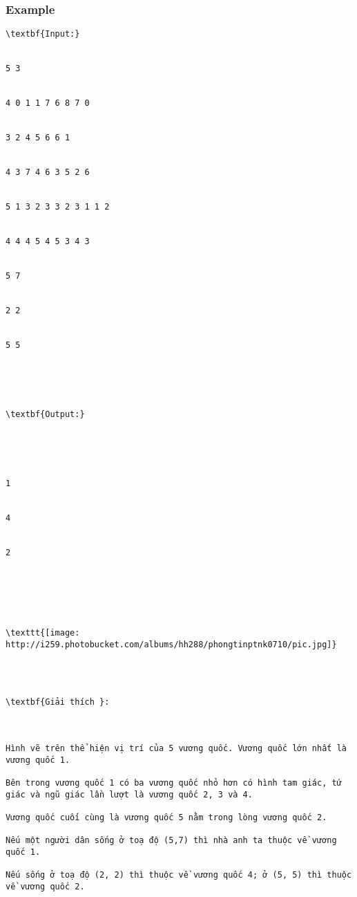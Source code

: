 \subsubsection{   Example  }
\begin{verbatim}
\textbf{Input:}


5 3


4 0 1 1 7 6 8 7 0


3 2 4 5 6 6 1


4 3 7 4 6 3 5 2 6


5 1 3 2 3 3 2 3 1 1 2


4 4 4 5 4 5 3 4 3


5 7


2 2


5 5





\textbf{Output:}





1


4


2






\texttt{[image: http://i259.photobucket.com/albums/hh288/phongtinptnk0710/pic.jpg]}




\textbf{Giải thích }: 

 

Hình vẽ trên thể hiện vị trí của 5 vương quốc. Vương quốc lớn nhất là vương quốc 1. 

Bên trong vương quốc 1 có ba vương quốc nhỏ hơn có hình tam giác, tứ giác và ngũ giác lần lượt là vương quốc 2, 3 và 4.

Vương quốc cuối cùng là vương quốc 5 nằm trong lòng vương quốc 2. 

Nếu một người dân sống ở toạ độ (5,7) thì nhà anh ta thuộc về vương quốc 1. 

Nếu sống ở toạ độ (2, 2) thì thuộc về vương quốc 4; ở (5, 5) thì thuộc về vương quốc 2.\end{verbatim}
